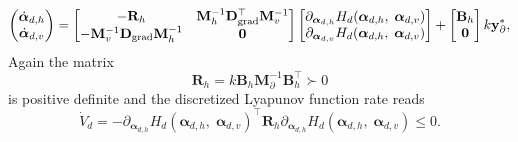 \begin{equation}\label{eq:pHsys_findim_shwater_ctrlcl}
\begin{pmatrix}
\dot{\bm{\alpha}}_{d, h} \\
\dot{\bm{\alpha}}_{d, v} \\
\end{pmatrix}
= \begin{bmatrix}
-\mathbf{R}_h &  \mathbf{M}_h^{-1} \mathbf{D}_{\operatorname*{grad}}^\top \mathbf{M}_v^{-1} \\
-\mathbf{M}_v^{-1} \mathbf{D}_{\operatorname*{grad}} \mathbf{M}_h^{-1} & \mathbf{0} \\
\end{bmatrix} 
\begin{bmatrix}
\partial_{\bm{\alpha}_{d, h}} H_d(\bm{\alpha}_{d, h},\; \bm{\alpha}_{d, v})\\
\partial_{\bm{\alpha}_{d, v}} H_d(\bm{\alpha}_{d, h},\; \bm{\alpha}_{d, v})\\
\end{bmatrix} + 
\begin{bmatrix}
\mathbf{B}_h \\
\mathbf{0}\\
\end{bmatrix}
k \mathbf{y}_\partial^*, 
\end{equation}
Again the matrix 
\begin{equation*}
	\mathbf{R}_h = k \mathbf{B}_h \mathbf{M}_\partial^{-1} \mathbf{B}_h^\top \succ 0
\end{equation*}
is positive definite and the discretized Lyapunov function rate reads
\begin{equation*}
\dot{V}_d = - \partial_{\bm{\alpha}_{d, h}} H_d(\bm{\alpha}_{d, h},\; \bm{\alpha}_{d, v})^\top \mathbf{R}_h \partial_{\bm{\alpha}_{d, h}} H_d(\bm{\alpha}_{d, h},\; \bm{\alpha}_{d, v}) \le 0.
\end{equation*}

